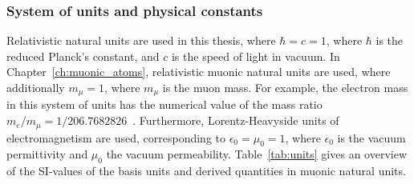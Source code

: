 \subsubsection*{System of units and physical constants}
Relativistic natural units are used in this thesis, where $\hbar=c=1$, where $\hbar$ is the reduced Planck's constant, and $c$ is the speed of light in vacuum. In Chapter~\ref{ch:muonic_atoms}, relativistic muonic natural units are used, where additionally $m_\mu=1$, where $m_\mu$ is the muon mass. For example, the electron mass in this system of units has the numerical value of the mass ratio $m_e/m_\mu = 1/206.768 2826$~\cite{codata}.
Furthermore, Lorentz-Heavyside units of electromagnetism are used, corresponding to $\epsilon_0=\mu_0=1$, where $\epsilon_0$ is the vacuum permittivity and $\mu_0$ the vacuum permeability.
Table~\ref{tab:units} gives an overview of the SI-values of the basis units and derived quantities in muonic natural units.\\[1.5cm]

